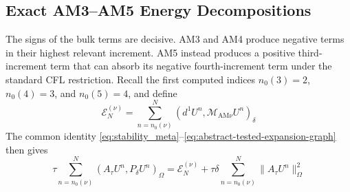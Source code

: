 \documentclass[11pt]{article}
\begin{document}
\subsection{Exact AM3--AM5 Energy Decompositions}
\label{subsec:adams-energy-decompositions}
The signs of the bulk terms are decisive. AM3 and AM4 produce negative terms
in their highest relevant increment. AM5 instead produces a positive
third-increment term that can absorb its negative fourth-increment term under
the standard CFL restriction.
Recall the first computed indices \(n_0(3)=2\), \(n_0(4)=3\), and
\(n_0(5)=4\), and define
\begin{equation}
\mathcal E_N^{(\nu)}
=\sum_{n=n_0(\nu)}^N
(d^1U^n,\mathcal M_{\mathrm{AM}\nu}U^n)_{\delta} \label{eq:adams-discrete-energy}
\end{equation}
The common identity \eqref{eq:stability_meta}--\eqref{eq:abstract-tested-expansion-graph}
then gives
\begin{equation}
\tau\sum_{n=n_0(\nu)}^N
(A_{\tau}U^n,P_{\delta}U^n)_{\Omega}
=\mathcal E_N^{(\nu)}
+\tau\delta\sum_{n=n_0(\nu)}^N\|A_{\tau}U^n\|_{\Omega}^2 \label{eq:adams-tested-energy-identity}
\end{equation}
\end{document}
